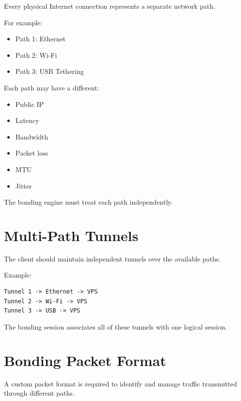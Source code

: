 \documentclass[12pt,a4paper]{article}
\begin{document}
Every physical Internet connection represents a separate network path.

For example:

\begin{itemize}
    \item Path 1: Ethernet
    \item Path 2: Wi-Fi
    \item Path 3: USB Tethering
\end{itemize}

Each path may have a different:

\begin{itemize}
    \item Public IP
    \item Latency
    \item Bandwidth
    \item Packet loss
    \item MTU
    \item Jitter
\end{itemize}

The bonding engine must treat each path independently.


\section{Multi-Path Tunnels}

The client should maintain independent tunnels over the available paths.

Example:

\begin{verbatim}
Tunnel 1 -> Ethernet -> VPS
Tunnel 2 -> Wi-Fi -> VPS
Tunnel 3 -> USB -> VPS
\end{verbatim}

The bonding session associates all of these tunnels with one logical session.


\section{Bonding Packet Format}

A custom packet format is required to identify and manage traffic transmitted through different paths.
\end{document}
